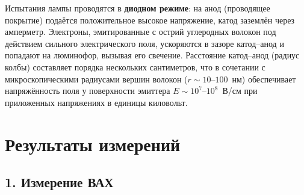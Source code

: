 \documentclass[12pt, a4paper]{article}
\begin{document}

Испытания лампы проводятся в \textbf{диодном режиме}: на анод (проводящее покрытие) подаётся положительное высокое напряжение, катод заземлён через амперметр. Электроны, эмитированные с острий углеродных волокон под действием сильного электрического поля, ускоряются в зазоре катод--анод и попадают на люминофор, вызывая его свечение. Расстояние катод--анод (радиус колбы) составляет порядка нескольких сантиметров, что в сочетании с микроскопическими радиусами вершин волокон ($r \sim 10$--$100$~нм) обеспечивает напряжённость поля у поверхности эмиттера $E \sim 10^{7}$--$10^{8}$~В/см при приложенных напряжениях в единицы киловольт.


\section*{Результаты измерений}

\subsection*{1. Измерение ВАХ}
\end{document}
